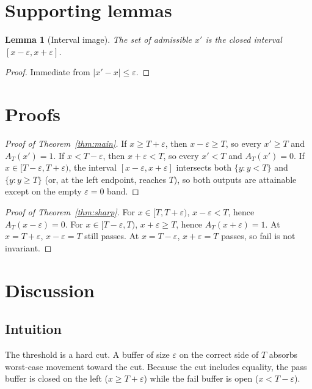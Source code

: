 \documentclass[11pt]{article}
\newtheorem{lemma}[theorem]{Lemma}
\begin{document}
\section{Supporting lemmas}
\begin{lemma}[Interval image]\label{lem:interval}
The set of admissible \(x'\) is the closed interval \([x-\varepsilon,x+\varepsilon]\).
\end{lemma}
\begin{proof}
Immediate from \(\lvert x'-x\rvert\le\varepsilon\).
\end{proof}

\section{Proofs}
\begin{proof}[Proof of Theorem~\ref{thm:main}]
If \(x\ge T+\varepsilon\), then \(x-\varepsilon\ge T\), so every \(x'\ge T\) and
\(A_T(x')=1\).
If \(x<T-\varepsilon\), then \(x+\varepsilon<T\), so every \(x'<T\) and
\(A_T(x')=0\).
If \(x\in[T-\varepsilon,T+\varepsilon)\), the interval
\([x-\varepsilon,x+\varepsilon]\) intersects both \(\{y:y<T\}\) and
\(\{y:y\ge T\}\) (or, at the left endpoint, reaches \(T\)), so both outputs
are attainable except on the empty \(\varepsilon=0\) band.
\end{proof}

\begin{proof}[Proof of Theorem~\ref{thm:sharp}]
For \(x\in[T,T+\varepsilon)\), \(x-\varepsilon<T\), hence \(A_T(x-\varepsilon)=0\).
For \(x\in[T-\varepsilon,T)\), \(x+\varepsilon\ge T\), hence \(A_T(x+\varepsilon)=1\).
At \(x=T+\varepsilon\), \(x-\varepsilon=T\) still passes.
At \(x=T-\varepsilon\), \(x+\varepsilon=T\) passes, so fail is not invariant.
\end{proof}

\section{Discussion}
\subsection{Intuition}
The threshold is a hard cut. A buffer of size \(\varepsilon\) on the correct side
of \(T\) absorbs worst-case movement toward the cut.
Because the cut includes equality, the pass buffer is closed on the left
(\(x\ge T+\varepsilon\)) while the fail buffer is open (\(x<T-\varepsilon\)).
\end{document}
